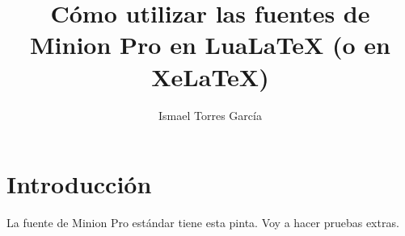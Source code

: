 \documentclass[12pt]{article}
\title{Cómo utilizar las fuentes de Minion Pro en LuaLaTeX (o en XeLaTeX)}
\author{Ismael Torres García}
\begin{document}
\maketitle

\section{Introducción}
La fuente de Minion Pro estándar tiene esta pinta. Voy a hacer pruebas extras.
\end{document}
